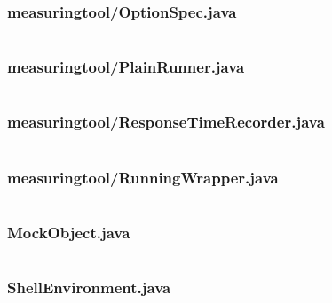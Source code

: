 \documentclass[a4paper,11pt]{article}
\begin{document}
\subsubsection{measuringtool/OptionSpec.java}
\inputminted[fontsize=\footnotesize, linenos, numbersep=5pt, tabsize=4, frame=topline,framesep=0.8cm]{java}{/home/tituomin/StudioProjects/nativebenchmark/src/fi/helsinki/cs/tituomin/nativebenchmark/measuringtool/OptionSpec.java}
\vspace{1cm}
\subsubsection{measuringtool/PlainRunner.java}
\inputminted[fontsize=\footnotesize, linenos, numbersep=5pt, tabsize=4, frame=topline,framesep=0.8cm]{java}{/home/tituomin/StudioProjects/nativebenchmark/src/fi/helsinki/cs/tituomin/nativebenchmark/measuringtool/PlainRunner.java}
\vspace{1cm}
\subsubsection{measuringtool/ResponseTimeRecorder.java}
\inputminted[fontsize=\footnotesize, linenos, numbersep=5pt, tabsize=4, frame=topline,framesep=0.8cm]{java}{/home/tituomin/StudioProjects/nativebenchmark/src/fi/helsinki/cs/tituomin/nativebenchmark/measuringtool/ResponseTimeRecorder.java}
\vspace{1cm}
\subsubsection{measuringtool/RunningWrapper.java}
\inputminted[fontsize=\footnotesize, linenos, numbersep=5pt, tabsize=4, frame=topline,framesep=0.8cm]{java}{/home/tituomin/StudioProjects/nativebenchmark/src/fi/helsinki/cs/tituomin/nativebenchmark/measuringtool/RunningWrapper.java}
\vspace{1cm}
\subsubsection{MockObject.java}
\inputminted[fontsize=\footnotesize, linenos, numbersep=5pt, tabsize=4, frame=topline,framesep=0.8cm]{java}{/home/tituomin/StudioProjects/nativebenchmark/src/fi/helsinki/cs/tituomin/nativebenchmark/MockObject.java}
\vspace{1cm}
\subsubsection{ShellEnvironment.java}
\inputminted[fontsize=\footnotesize, linenos, numbersep=5pt, tabsize=4, frame=topline,framesep=0.8cm]{java}{/home/tituomin/StudioProjects/nativebenchmark/src/fi/helsinki/cs/tituomin/nativebenchmark/ShellEnvironment.java}
\vspace{1cm}
\end{document}
